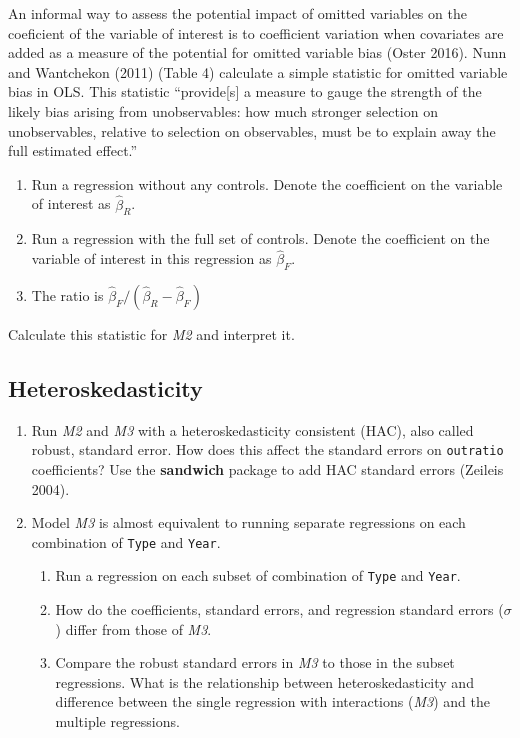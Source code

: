 \documentclass[]{article}
\providecommand{\tightlist}{%
  \setlength{\itemsep}{0pt}\setlength{\parskip}{0pt}}
\begin{document}
An informal way to assess the potential impact of omitted variables on
the coeficient of the variable of interest is to coefficient variation
when covariates are added as a measure of the potential for omitted
variable bias (Oster 2016). Nunn and Wantchekon (2011) (Table 4)
calculate a simple statistic for omitted variable bias in OLS. This
statistic ``provide{[}s{]} a measure to gauge the strength of the likely
bias arising from unobservables: how much stronger selection on
unobservables, relative to selection on observables, must be to explain
away the full estimated effect.''

\begin{enumerate}
\def\labelenumi{\arabic{enumi}.}
\tightlist
\item
  Run a regression without any controls. Denote the coefficient on the
  variable of interest as \(\hat\beta_R\).
\item
  Run a regression with the full set of controls. Denote the coefficient
  on the variable of interest in this regression as \(\hat\beta_F\).
\item
  The ratio is \(\hat\beta_F / (\hat\beta_R - \hat\beta_F)\)
\end{enumerate}

Calculate this statistic for \emph{M2} and interpret it.

\subsection{Heteroskedasticity}\label{heteroskedasticity}

\begin{enumerate}
\def\labelenumi{\arabic{enumi}.}
\item
  Run \emph{M2} and \emph{M3} with a heteroskedasticity consistent
  (HAC), also called robust, standard error. How does this affect the
  standard errors on \texttt{outratio} coefficients? Use the
  \textbf{sandwich} package to add HAC standard errors (Zeileis 2004).
\item
  Model \emph{M3} is almost equivalent to running separate regressions
  on each combination of \texttt{Type} and \texttt{Year}.

  \begin{enumerate}
  \def\labelenumii{\arabic{enumii}.}
  \tightlist
  \item
    Run a regression on each subset of combination of \texttt{Type} and
    \texttt{Year}.
  \item
    How do the coefficients, standard errors, and regression standard
    errors (\(\sigma\)) differ from those of \emph{M3}.
  \item
    Compare the robust standard errors in \emph{M3} to those in the
    subset regressions. What is the relationship between
    heteroskedasticity and difference between the single regression with
    interactions (\emph{M3}) and the multiple regressions.
  \end{enumerate}
\end{enumerate}
\end{document}
